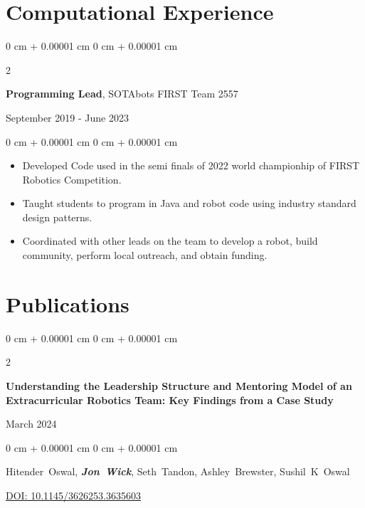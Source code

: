 \documentclass[10pt, letterpaper]{article}
\newenvironment{highlights}{
    \begin{itemize}[
        topsep=0.10 cm,
        parsep=0.10 cm,
        partopsep=0pt,
        itemsep=0pt,
        leftmargin=0 cm + 10pt
    ]
}{
    \end{itemize}
} %
\newenvironment{onecolentry}{
    \begin{adjustwidth}{
        0 cm + 0.00001 cm
    }{
        0 cm + 0.00001 cm
    }
}{
    \end{adjustwidth}
} %
\newenvironment{twocolentry}[2][]{
    \onecolentry
    \def\secondColumn{#2}
    \setcolumnwidth{\fill, 4.5 cm}
    \begin{paracol}{2}
}{
    \switchcolumn \raggedleft \secondColumn
    \end{paracol}
    \endonecolentry
} %
\begin{document}
    \section{Computational Experience}
    \begin{samepage}
      \begin{twocolentry}
        {September 2019 - June 2023}
        \textbf {Programming Lead}, SOTAbots FIRST Team 2557


      \end{twocolentry}
      \begin{onecolentry}
        \begin{highlights}
      \item Developed Code used in the semi finals of 2022 world championhip of FIRST Robotics Competition.
      \item Taught students to program in Java and robot code using industry standard design patterns.
      \item Coordinated with other leads on the team to develop a robot, build community, perform local outreach, and obtain funding.

        \end{highlights}
      \end{onecolentry}
    \end{samepage}
    \section{Publications}




        \begin{samepage}
            \begin{twocolentry}{
                March 2024
            }
                \textbf{Understanding the Leadership Structure and Mentoring Model of an Extracurricular Robotics Team: Key Findings from a Case Study}
            \end{twocolentry}

            \vspace{0.10 cm}

            \begin{onecolentry}
              \mbox{Hitender Oswal}, \mbox{\textbf{\textit{Jon Wick}}}, \mbox{Seth Tandon}, \mbox{Ashley Brewster}, \mbox{Sushil K Oswal}

                \vspace{0.10 cm}

        \href{https://doi.org/10.1145/3626253.3635603}{DOI: 10.1145/3626253.3635603}
        \end{onecolentry}
        \end{samepage}
\end{document}
